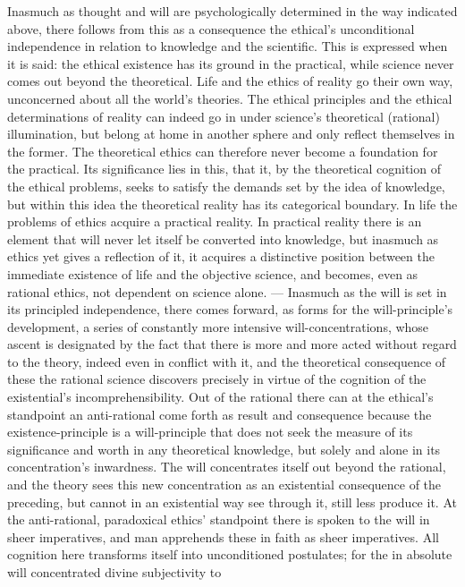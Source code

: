 \documentclass[12pt,a4paper]{book}
\begin{document}
Inasmuch as thought and will are psychologically determined in the way indicated above, there
follows from this as a consequence the ethical's unconditional independence in relation to
knowledge and the scientific. This is expressed when it is said: the ethical existence has its
ground in the practical, while science never comes out beyond the theoretical. Life and the
ethics of reality go their own way, unconcerned about all the world's theories. The ethical
principles and the ethical determinations of reality can indeed go in under science's theoretical
(rational) illumination, but belong at home in another sphere and only reflect themselves in the
former. The theoretical ethics can therefore never become a foundation for the practical. Its
significance lies in this, that it, by the theoretical cognition of the ethical problems, seeks to
satisfy the demands set by the idea of knowledge, but within this idea the theoretical reality has
its categorical boundary. In life the problems of ethics acquire a practical reality. In practical
reality there is an element that will never let itself be converted into knowledge, but inasmuch as
ethics yet gives a reflection of it, it acquires a distinctive position between the immediate
existence of life and the objective science, and becomes, even as rational ethics, not dependent on
science alone. ---
Inasmuch as the will is set in its principled independence, there comes forward, as forms for the
will-principle's development, a series of constantly more intensive will-concentrations, whose
ascent is designated by the fact that there is more and more acted without regard to the theory,
indeed even in conflict with it, and the theoretical consequence of these the rational science
discovers precisely in virtue of the cognition of the existential's incomprehensibility. Out of the
rational there can at the ethical's standpoint an anti-rational come forth as result and consequence
because the existence-principle is a will-principle that does not seek the measure of its significance
and worth in any theoretical knowledge, but solely and alone in its concentration's inwardness. The
will concentrates itself out beyond the rational, and the theory sees this new concentration as an
existential consequence of the preceding, but cannot in an existential way see through it, still less
produce it. At the anti-rational, paradoxical ethics' standpoint there is spoken to the will in sheer
imperatives, and man apprehends these in faith as sheer imperatives. All cognition here transforms
itself into unconditioned postulates; for the in absolute will concentrated divine subjectivity to
\end{document}
